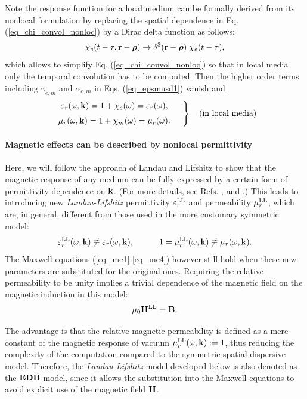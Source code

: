 Note the response function for a local medium can be formally derived from its nonlocal formulation by replacing the spatial dependence in Eq. (\ref{eq_chi_convol_nonloc}) by a Dirac delta function as follows: %
\begin{equation} \chi_e(t-\tau, {\mathbf{r}}-\boldsymbol{\rho}) \rightarrow \delta^{3}({\mathbf{r}}-\boldsymbol{\rho}) \; \chi_e(t-\tau), \label{eq_loc_chi}\end{equation}
which allows to simplify Eq. (\ref{eq_chi_convol_nonloc}) so that in local media only the temporal convolution has to be computed. Then the higher order terms including $\gamma_{e,m}$ and $\alpha_{e,m}$ in Eqs. (\ref{eq_epsmusd1}) vanish and
\begin{equation} 
\left.  \begin{array}{c}
\epsrn(\omega,\kk) = 1 + \chi_e(\omega) = \epsrl(\omega), \medskip \\
\murn(\omega,\kk) = 1 + \chi_m(\omega) = \murl(\omega). 
\end{array} \quad \right\} \quad \text{(in local media)}
\label{eq_epsmusd2}\end{equation}

\paragraph{Magnetic effects can be described by nonlocal permittivity} %
Here, we will follow the approach of Landau and Lifshitz \cite{landau1984electrodynamics} to show that the magnetic response of any medium can be fully expressed by a certain form of permittivity dependence on ${\mathbf{k}}$. (For more details, see Refs. \cite{agranovich2006spatial}, \cite[pp. 95-130]{krowne2007book}  and \cite[p. 19]{fietz2011homogenization}.) This leads to introducing new \textit{Landau-Lifshitz} permittivity $\varepsilon_r^\text{LL}$ and permeability $\mu_r^\text{LL}$, which are, in general, different from those used in the more customary symmetric model:
$$\varepsilon_r^\text{LL}(\omega, {\mathbf{k}}) \not\equiv \varepsilon_r(\omega, {\mathbf{k}}),\quad\quad\quad 1 = \mu_r^\text{LL}(\omega, {\mathbf{k}}) \not\equiv \mu_r(\omega, {\mathbf{k}}).$$
The Maxwell equations (\ref{eq_me1}-\ref{eq_me4}) however still hold when these new parameters are substituted for the original ones. Requiring the relative permeability to be unity implies a trivial dependence of the magnetic field on the magnetic induction in this model:
$$ \mu_0 {\mathbf{H}^\text{LL}} = \mathbf{B}. $$

The advantage is that the relative magnetic permeability is defined as a mere constant of the magnetic response of vacuum $\mu_r^\text{LL}(\omega, {\mathbf{k}}) := 1$, thus reducing the complexity of the computation compared to the symmetric spatial-dispersive model. %
Therefore, the \textit{Landau-Lifshitz} model developed below is also denoted as the $\mathbf{E}\mathbf{D}\mathbf{B}$-model, since it allows the substitution into the Maxwell equations to avoid explicit use of the magnetic field $\mathbf{H}$.

